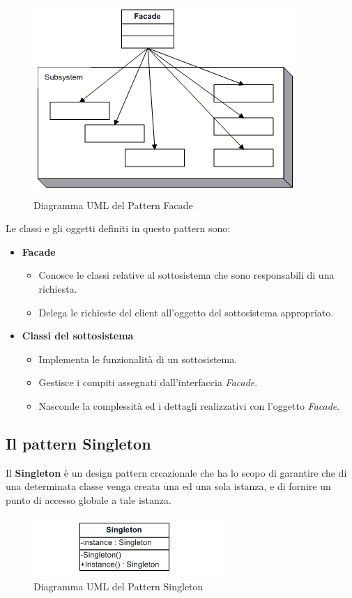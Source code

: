 \documentclass[12pt]{article}
\begin{document}
\begin{figure}[H]
	\centering
	\includegraphics[scale=0.70]{images/facade.jpg}
	\caption{Diagramma UML del Pattern Facade}
	\label{facade}
\end{figure}

Le classi e gli oggetti definiti in questo pattern sono:
\begin{itemize}
\item \textbf{Facade}
\begin{itemize}
	\item Conosce le classi relative al sottosistema che sono responsabili di una richiesta.
	\item Delega le richieste del client all'oggetto del sottosistema appropriato.
\end{itemize}
\item \textbf{Classi del sottosistema}
\begin{itemize}
	\item Implementa le funzionalità di un sottosistema.
	\item Gestisce i compiti assegnati dall'interfaccia \textit{Facade}.
	\item Nasconde la complessità ed i dettagli realizzativi con l'oggetto \textit{Facade}.
\end{itemize}
\end{itemize}

\subsection{Il pattern Singleton}
Il \textbf{Singleton} è un design pattern creazionale che ha lo scopo di garantire che di una determinata classe venga creata una ed una sola istanza, e di fornire un punto di accesso globale a tale istanza.

\begin{figure}[H]
	\centering
	\includegraphics[scale=0.90]{images/singleton.jpg}
	\caption{Diagramma UML del Pattern Singleton}
	\label{singleton}
\end{figure}
\end{document}
